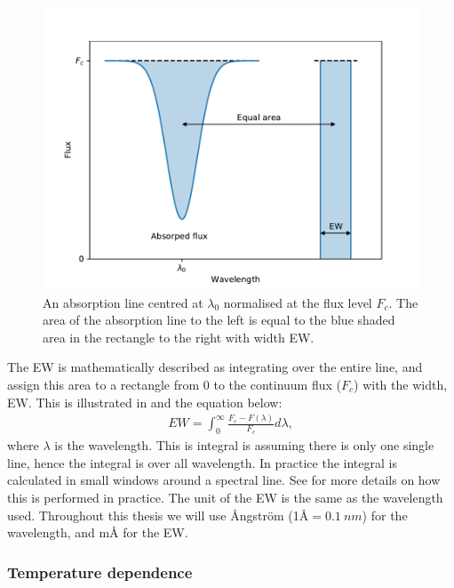 \begin{figure}[htpb!]
    \centering
    \includegraphics[width=1.0\linewidth]{figures/ewTheoretical.pdf}
    \caption{An absorption line centred at $\lambda_0$ normalised at the flux
             level $F_c$. The area of the absorption line to the left is equal
             to the blue shaded area in the rectangle to the right with width
             EW.}
    \label{fig:ewTheoretical}
\end{figure}

The EW is mathematically described as integrating over the entire line, and
assign this area to a rectangle from 0 to the continuum flux ($F_c$) with the
width, EW. This is illustrated in  and the equation
below: \begin{align} EW = \int_{0}^{\infty} \frac{F_c-F(\lambda)}{F_c} d\lambda,
\end{align} where $\lambda$ is the wavelength. This is integral is assuming
there is only one single line, hence the integral is over all wavelength. In
practice the integral is calculated in small windows around a spectral line. See
 for more details on how this is performed in practice. The
unit of the EW is the same as the wavelength used. Throughout this thesis we
will use \AA{}ngstr\"{o}m (1\AA$=\SI{0.1}{nm}$) for the wavelength, and m\AA{}
for the EW.


\subsubsection{Temperature dependence}

